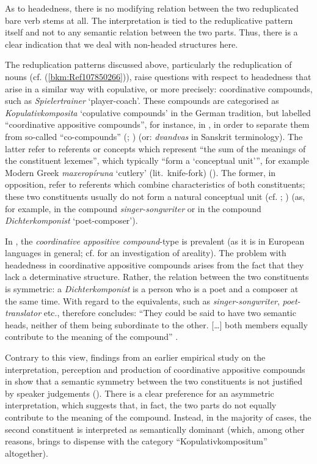 \documentclass[output=paper
  ,nobabel
  ,draftmode
  ,colorlinks, citecolor=brown
]{langscibook}
\begin{document}
As to headedness, there is no modifying relation between the two reduplicated bare verb stems at
all. The interpretation is tied to the reduplicative pattern itself and not to any semantic relation
between the two parts. Thus, there is a clear indication that we deal with non-headed structures
here.

The reduplication patterns discussed above, particularly the reduplication of nouns
(cf. (\ref{bkm:Ref107850266})), raise questions with respect to headedness that arise in a similar
way with copulative, or more precisely: coordinative compounds, such as \emph{Spielertrainer}
`player-coach'. These compounds are categorised as \emph{Kopulativkomposita} `copulative compounds'
in the German tradition, but labelled ``coordinative appositive compounds'', for instance, in , in order to separate them from so-called ``co-compounds'' (\citealt{Waelchli2005};
\citealt{Arcodia2018}) (or: \emph{dvandvas} in Sanskrit terminology). The latter refer to referents
or concepts which represent ``the sum of the meanings of the constituent lexemes'', which typically
``form a `conceptual unit''', for example Modern Greek \emph{maxeropíruna} `cutlery' (lit.\
knife-fork) (\citealt[1198–1199]{Arcodia2018}). The former, in opposition, refer to referents which
combine characteristics of both constituents; these two constituents usually do not form a natural
conceptual unit (cf. \citealt[5]{Waelchli2005}; \citealt[1198]{Arcodia2018}) (as, for example, in the
\ili{English} compound \emph{singer-songwriter} or in the \ili{German} compound \emph{Dichterkomponist}
`poet-composer').

In , the \emph{coordinative appositive compound}{}-type is prevalent (as it is in European
languages in general; cf. \citealt{Arcodia2018} for an investigation of areality). The problem with
headedness in \ili{German} coordinative appositive compounds arises from the fact that they lack a
determinative structure. Rather, the relation between the two constituents is symmetric: a
\emph{Dichterkomponist} is a person who is a poet and a composer at the same time. With regard to
the \ili{English} equivalents, such as \emph{singer-songwriter}, \emph{poet-translator} etc.,
\citet{Plag2003} therefore concludes: ``They could be said to have two semantic heads, neither of
them being subordinate to the other. […] both members equally contribute to the meaning of the
compound'' \citep[146]{Plag2003}.

Contrary to this view, findings from an earlier empirical study on the interpretation, perception
and production of coordinative appositive compounds in \ili{German} show that a semantic symmetry between
the two constituents is not justified by speaker judgements (\citealt{BreindlThurmair1992}). There
is a clear preference for an asymmetric interpretation, which suggests that, in fact, the two parts
do not equally contribute to the meaning of the compound. Instead, in the majority of cases, the
second constituent is interpreted as semantically dominant (which, among other reasons, brings
\citeauthor{BreindlThurmair1992} to dispense with the category ``Kopulativkompositum'' altogether).
\end{document}
